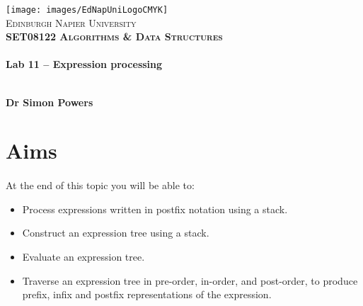 \documentclass[10pt, a4paper, twosize]{article}
\begin{document}

\begin{titlepage}
\vspace*{5cm}
\begin{center}
\texttt{[image: images/EdNapUniLogoCMYK]}~\\[1cm]

\textsc{\Large Edinburgh Napier University}\\[1.5cm]

\textsc{\LARGE \bfseries SET08122 Algorithms \& Data Structures}\\[0.5cm]

\hrulefill \\[0.4cm]
{\huge \bfseries Lab 11 -- Expression processing \\[0.4cm] }
\hrulefill \\[1.5cm]

\begin{minipage}{0.4\textwidth}
\begin{flushleft} \large
\textbf{Dr Simon Powers} \\
\end{flushleft}
\end{minipage}

\vfill

\end{center}
\end{titlepage}




%

\section{Aims}
\paragraph{} At the end of this topic you will be able to:

\begin{itemize}
\item Process expressions written in postfix notation using a stack.
\item Construct an expression tree using a stack.
\item Evaluate an expression tree.
\item Traverse an expression tree in pre-order, in-order, and post-order, to produce prefix, infix and postfix representations of the expression.
\end{itemize}
\end{document}
